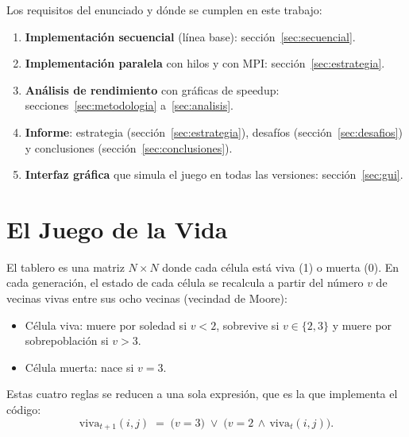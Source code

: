 \documentclass[11pt,a4paper]{article}
\begin{document}
Los requisitos del enunciado y dónde se cumplen en este trabajo:
\begin{enumerate}
  \item \textbf{Implementación secuencial} (línea base): sección~\ref{sec:secuencial}.
  \item \textbf{Implementación paralela} con hilos y con MPI: sección~\ref{sec:estrategia}.
  \item \textbf{Análisis de rendimiento} con gráficas de speedup: secciones~\ref{sec:metodologia}
        a~\ref{sec:analisis}.
  \item \textbf{Informe}: estrategia (sección~\ref{sec:estrategia}), desafíos (sección~\ref{sec:desafios})
        y conclusiones (sección~\ref{sec:conclusiones}).
  \item \textbf{Interfaz gráfica} que simula el juego en todas las versiones: sección~\ref{sec:gui}.
\end{enumerate}

\section{El Juego de la Vida}

El tablero es una matriz $N\times N$ donde cada célula está viva (1) o muerta (0). En cada generación,
el estado de cada célula se recalcula a partir del número $v$ de vecinas vivas entre sus ocho vecinas
(vecindad de Moore):

\begin{itemize}
  \item Célula viva: muere por soledad si $v<2$, sobrevive si $v\in\{2,3\}$ y muere por sobrepoblación si $v>3$.
  \item Célula muerta: nace si $v=3$.
\end{itemize}
Estas cuatro reglas se reducen a una sola expresión, que es la que implementa el código:
\[
  \text{viva}_{t+1}(i,j) \;=\; \big(v = 3\big) \;\lor\; \big(v = 2 \,\land\, \text{viva}_t(i,j)\big).
\]
\end{document}
